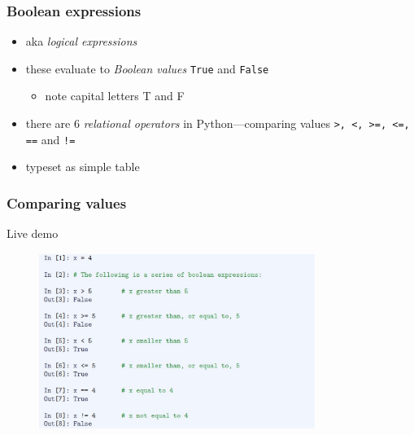 \documentclass[english,14pt]{beamer}
\newcommand\red[1]{{\color{red} #1}}
\begin{document}

\begin{frame}[fragile]

\frametitle{Boolean expressions}

	
	
\begin{itemize}
	\item aka \red{\emph{logical expressions}}
	\item these evaluate to \red{\emph{Boolean values}} \texttt{True} and \texttt{False}
	\begin{itemize}
		\item note capital letters T and F
	\end{itemize}
	\item  there are 6 \red{\emph{relational operators}} in Python---comparing values
	 \verb+>, <, >=, <=, ==+ and \verb+!=+
	 \item typeset as simple table
	 
\end{itemize}

\end{frame}


\begin{frame}[fragile]

\frametitle{Comparing values}

Live demo

\begin{figure}[ht]
	\centering
	\includegraphics[width=0.8\textwidth]{figures/LLp46}
\end{figure}


	
\end{frame}
\end{document}
